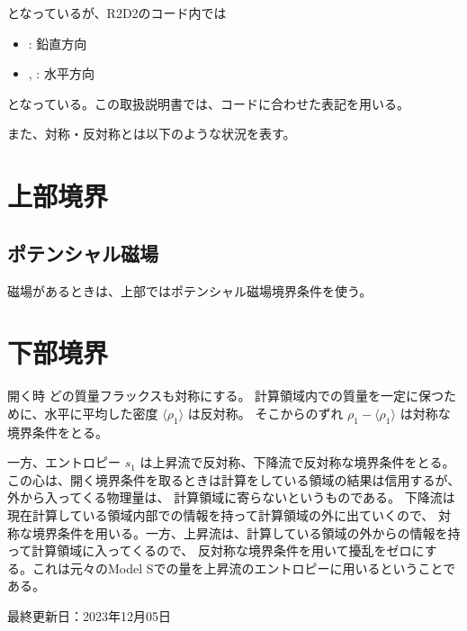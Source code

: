 \documentclass[letterpaper,10pt,dvipdfmx,report]{sphinxmanual}
\let\sphinxpxdimen\pdfpxdimen\else\newdimen\sphinxpxdimen
\begin{document}
\sphinxAtStartPar
となっているが、R2D2のコード内では
\begin{itemize}
\item {} 
\sphinxAtStartPar
{}: 鉛直方向

\item {} 
\sphinxAtStartPar
{}, : 水平方向

\end{itemize}

\sphinxAtStartPar
となっている。この取扱説明書では、コードに合わせた表記を用いる。

\sphinxAtStartPar
また、対称・反対称とは以下のような状況を表す。

\noindent\sphinxincludegraphics[width=450\sphinxpxdimen]{{bc_sym}.png}


\section{上部境界}
\label{\detokenize{boundary:id2}}

\subsection{ポテンシャル磁場}
\label{\detokenize{boundary:id3}}
\sphinxAtStartPar
磁場があるときは、上部ではポテンシャル磁場境界条件を使う。


\section{下部境界}
\label{\detokenize{boundary:id4}}
\sphinxAtStartPar
開く時
どの質量フラックスも対称にする。 計算領域内での質量を一定に保つために、水平に平均した密度
\(\langle \rho_1\rangle\) は反対称。 そこからのずれ
\(\rho_1 - \langle \rho_1 \rangle\) は対称な境界条件をとる。

\sphinxAtStartPar
一方、エントロピー \(s_1\) は上昇流で反対称、下降流で反対称な境界条件をとる。
この心は、開く境界条件を取るときは計算をしている領域の結果は信用するが、外から入ってくる物理量は、
計算領域に寄らないというものである。 下降流は現在計算している領域内部での情報を持って計算領域の外に出ていくので、
対称な境界条件を用いる。一方、上昇流は、計算している領域の外からの情報を持って計算領域に入ってくるので、
反対称な境界条件を用いて擾乱をゼロにする。これは元々のModel Sでの量を上昇流のエントロピーに用いるということである。

\sphinxAtStartPar
最終更新日：2023年12月05日
\end{document}
